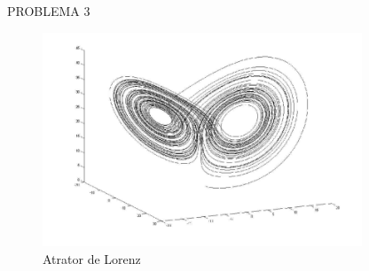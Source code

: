 \documentclass[12pt,oneside,openright,a4paper,english,brazil]{abntex2}
\begin{document}
\clearpage
\centerline{PROBLEMA 3}



\begin{figure}[!htb]
  \begin{center}
    \caption{\label{fig:Lorenzatt}Atrator de Lorenz}
    \includegraphics[scale=0.2, width=0.85\textwidth,height=0.65\textheight]{./atrator.png}
  \end{center}
\end{figure}
\end{document}

